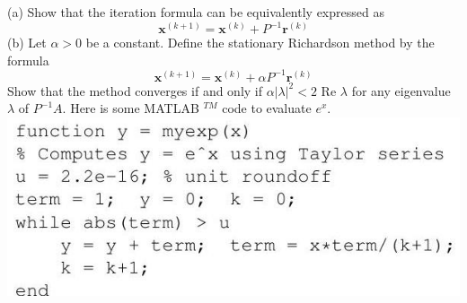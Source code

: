 \documentclass[14pt]{extarticle}
\begin{document}
(a) Show that the iteration formula can be equivalently expressed as
$$
\boldsymbol{x}^{(k+1)}=\boldsymbol{x}^{(k)}+P^{-1} \boldsymbol{r}^{(k)}
$$
(b) Let $\alpha>0$ be a constant. Define the stationary Richardson method by the formula
$$
\boldsymbol{x}^{(k+1)}=\boldsymbol{x}^{(k)}+\alpha P^{-1} \boldsymbol{r}^{(k)}
$$
Show that the method converges if and only if $\alpha|\lambda|^{2}<2$ Re $\lambda$ for any eigenvalue $\lambda$ of $P^{-1} A$.
\newpage
Here is some MATLAB ${ }^{T M}$ code to evaluate $e^{x}$.
\includegraphics{2022_05_24_68a702cbf9a84fb58e04g-06}
\end{document}
